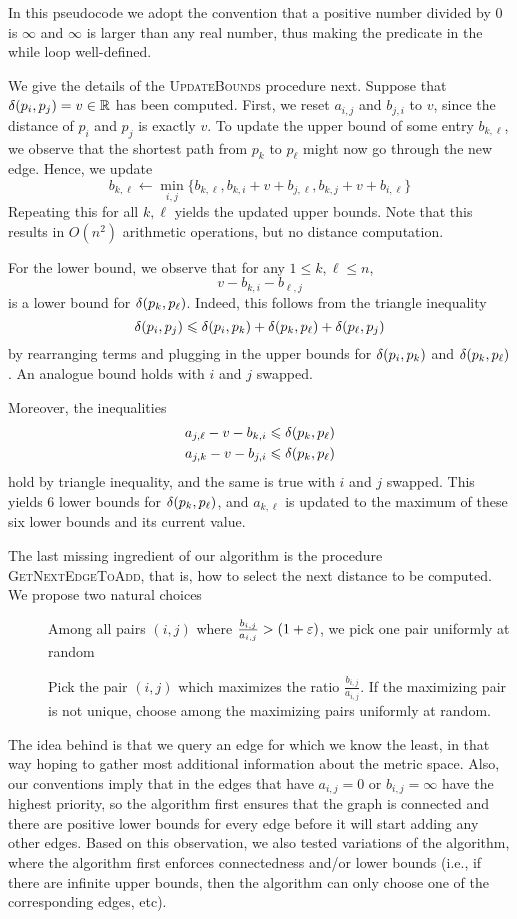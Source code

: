 \documentclass[a4paper,UKenglish,cleveref, autoref]{lipics-v2019}
\begin{document}
In this pseudocode we adopt the convention that a positive number divided by 0 is $\infty$
and $\infty$ is larger than any real number,
thus making the predicate in the while loop well-defined.  

We give the details of the \textsc{UpdateBounds} procedure next.
Suppose that
$\delta(p_i,p_j)=v\in\mathbb{R}$ has been computed.
First, we reset $a_{i,j}$ and $b_{j,i}$ to $v$, since the distance
of $p_i$ and $p_j$ is exactly $v$.
To update the upper bound of some entry $b_{k,\ell}$,
we observe that the shortest path from $p_k$ to $p_\ell$ might now
go through the new edge. Hence, we update
\[
    b_{k,\ell}\gets \min_{i,j}\{b_{k,\ell},b_{k,i}+v+b_{j,\ell},b_{k,j}+v+b_{i,\ell}\}
\]
Repeating this for all $k,\ell$ yields the updated upper bounds.
Note that this results in $O(n^2)$ arithmetic operations,
but no distance computation.

For the lower bound, we observe that for any $1\leq k,\ell\leq n$,
\[
    v-b_{k,i}-b_{\ell,j}
\]
is a lower bound for $\delta(p_k,p_\ell)$. Indeed, this follows from
the triangle inequality
%
\[\delta(p_i,p_j)\leqslant \delta(p_i,p_k)+\delta(p_k,p_\ell)+\delta(p_\ell,p_j)\]
by rearranging terms and plugging in the upper bounds for $\delta(p_i,p_k)$
and $\delta(p_k,p_\ell)$. An analogue bound holds with $i$ and $j$ swapped. 

Moreover, the inequalities
\begin{align*}
  a_{j,\ell} - v - b_{k,i}&\leqslant \delta(p_k,p_\ell)\\
  a_{j,k} - v - b_{j,i}&\leqslant \delta(p_k,p_\ell)
\end{align*}
hold by triangle inequality, and the same is true with $i$ and $j$ swapped.
This yields $6$ lower bounds for $\delta(p_k,p_\ell)$, and $a_{k,\ell}$
is updated to the maximum of these six lower bounds and its current value.

%
The last missing ingredient of our algorithm is the procedure \textsc{GetNextEdgeToAdd},
that is, how to select the next distance to be computed. We propose two natural choices

\begin{description}
\item[\brndm] Among all pairs $(i,j)$ where $\frac{b_{i,j}}{a_{i,j}}>(1+\varepsilon)$,
we pick one pair uniformly at random
\item[\bgrdy] Pick the pair $(i,j)$ which maximizes the ratio $\frac{b_{i,j}}{a_{i,j}}$.
If the maximizing pair is not unique, choose among the maximizing pairs uniformly at random.
\end{description}
%
The idea behind \bgrdy is that we query an edge for which we know the least,
in that way hoping to gather most additional information about the metric space.
Also, our conventions imply that in \bgrdy the edges that have $a_{i,j} = 0$ or $b_{i,j} = \infty$
have the highest priority, so the algorithm first ensures that the graph is connected and there are positive
lower bounds for every edge before it will start adding any other edges. Based on this observation,
we also tested variations of the \brndm algorithm, where the algorithm
first enforces connectedness and/or lower bounds (i.e., if there are infinite upper bounds,
then the algorithm can only choose one of the corresponding edges, etc).
\end{document}
